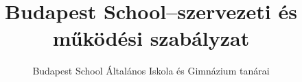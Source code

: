 \documentclass[magyar,12pt,a4paper,draft]{report}
\begin{document}
\newif\ifkerettanterv
\kerettantervfalse

\title{Budapest School–szervezeti és működési szabályzat}
\author{Budapest School Általános Iskola és Gimnázium tanárai}
\maketitle


\tableofcontents
\newpage
 



{}
\label{sec:bibliographyk}

 
\end{document}
